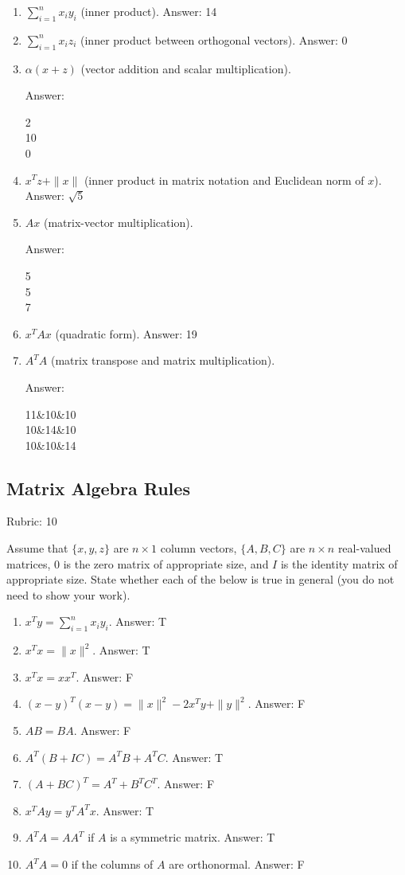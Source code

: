 \documentclass{article}
\newcommand{\ans}[1]{\green{Answer: #1}}
\newcommand{\rubric}[1]{\green{Rubric: #1}}
\newcommand{\blue}[1]{{\color{blue}#1}}
\newcommand{\green}[1]{{\color{green}#1}}
\newcommand{\norm}[1]{\|#1\|}
\newcommand{\mat}[1]{\begin{bmatrix}#1\end{bmatrix}}
\begin{document}
    \begin{enumerate}
        \item $\sum_{i=1}^n x_i y_i$ (inner product). \ans{14}
        \item $\sum_{i=1}^n x_i z_i$ (inner product between orthogonal vectors). \ans{0}
        \item $\alpha(x+z)$ (vector addition and scalar multiplication). \ans{\mat{2\\10\\0}}
        \item $x^T z + \norm{x}$ (inner product in matrix notation and Euclidean norm of $x$). \ans{$\sqrt{5}$}
        \item $Ax$ (matrix-vector multiplication). \ans{\mat{5\\5\\7}}
        \item $x^T Ax$ (quadratic form). \ans{19}
        \item $A^T A$ (matrix transpose and matrix multiplication).
            \ans{\mat{11&10&10\\ 10&14&10\\ 10&10&14}}
    \end{enumerate}

    \subsection{Matrix Algebra Rules}
    \rubric{10}

    Assume that $\{x,y,z\}$ are $n \times 1$ column vectors, $\{A,B,C\}$ are $n \times n$ real-valued matrices, $0$ is the zero matrix of appropriate size, and $I$ is the identity matrix of appropriate size. \blue{State whether each of the below is true in general} (you do not need to show your work).

    \begin{enumerate}
        \item $x^T y = \sum_{i=1}^n x_i y_i$. \ans{T}
        \item $x^T x = \norm{x}^2$. \ans{T}
        \item $x^T x = xx^T$. \ans{F}
        \item $(x-y)^T(x-y) = \norm{x}^2 - 2x^T y + \norm{y}^2$. \ans{F}
        \item $AB=BA$. \ans{F}
        \item $A^T(B + IC) = A^T B + A^T C$. \ans{T}
        \item $(A + BC)^T = A^T + B^T C^T$. \ans{F}
        \item $x^T Ay = y^T A^T x$. \ans{T}
        \item $A^T A = AA^T$ if $A$ is a symmetric matrix. \ans{T}
        \item $A^T A = 0$ if the columns of $A$ are orthonormal. \ans{F}
    \end{enumerate}
\end{document}
